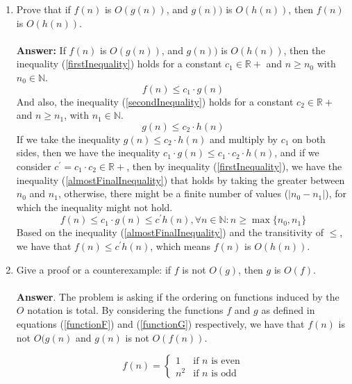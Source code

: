 \documentclass[12pt]{scrartcl}
\begin{document}
\begin{enumerate}
\begin{enumerate}
		\item Prove that if $f(n)$ is $O(g(n))$, and $g(n))$ is $O(h(n))$, then $f(n)$ is $O(h(n))$.\\
		\\
		\textbf{Answer:} If $f(n)$ is $O(g(n))$, and $g(n))$ is $O(h(n))$, then the inequality (\ref{firstInequality}) holds for a constant $c_1 \in \mathbb{R+}$ and $n \ge n_0$ with $n_0 \in \mathbb{N}$.
		\begin{equation}\label{firstInequality}
		f(n) \le c_1 \cdot g(n)
		\end{equation}
		And also, the inequality (\ref{secondInequality}) holds for a constant $c_2 \in \mathbb{R+}$ and $n \ge n_1$, with $n_1 \in \mathbb{N}$.
		\begin{equation}\label{secondInequality}
		g(n) \le c_2 \cdot h(n)
		\end{equation}
		If we take the inequality $g(n) \le c_2 \cdot h(n)$ and multiply by $c_1$ on both sides, then we have the inequality $c_1 \cdot g(n) \le c_1 \cdot c_2 \cdot h(n)$, and if we consider $c^\prime = c_1 \cdot c_2 \in \mathbb{R+}$, then by inequality (\ref{firstInequality}), we have the inequality (\ref{almostFinalInequality}) that holds by taking the greater between $n_0$ and $n_1$, otherwise, there might be a finite number of values ($|n_0 - n_1|$), for which the inequality might not hold.
		\begin{equation}\label{almostFinalInequality}
		f(n) \le c_1 \cdot g(n) \le c^\prime h(n), \forall n \in \mathbb{N}: n \ge \max\{n_0, n_1\}
		\end{equation}
		 Based on the inequality (\ref{almostFinalInequality}) and the transitivity of $\le$, we have that $f(n) \leq c^\prime h(n)$, which means $f(n)$ is $O(h(n))$.
		\item Give a proof or a counterexample: if $f$ is not $O(g)$, then $g$ is $O(f)$.\\
		\\
		\textbf{Answer}. The problem is asking if the ordering on functions induced by the $O$ notation is total. By considering the functions $f$ and $g$ as defined in equations (\ref{functionF}) and (\ref{functionG}) respectively, we have that $f(n)$ is not $O(g(n)$ and $g(n)$ is not $O(f(n))$.
		
			\begin{equation}\label{functionF}
				f(n) = \left\{ 
					\begin{array}{cl}
						1	&	\text{if $n$ is even}\\
						n^2	&	\text{if $n$ is odd}
					\end{array}
					\right.
			\end{equation}
			

\end{enumerate}
\end{enumerate}
\end{document}
